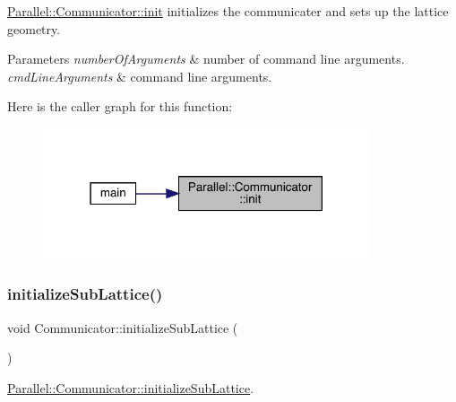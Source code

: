 \mbox{\hyperlink{class_parallel_1_1_communicator_a4ed2a77c33cd899b31131e44fc906fd7}{Parallel\+::\+Communicator\+::init}} initializes the communicater and sets up the lattice geometry. 


\begin{DoxyParams}{Parameters}
{\em number\+Of\+Arguments} & number of command line arguments. \\
\hline
{\em cmd\+Line\+Arguments} & command line arguments. \\
\hline
\end{DoxyParams}
Here is the caller graph for this function\+:
\nopagebreak
\begin{figure}[H]
\begin{center}
\leavevmode
\includegraphics[width=274pt]{class_parallel_1_1_communicator_a4ed2a77c33cd899b31131e44fc906fd7_icgraph}
\end{center}
\end{figure}
\mbox{\label{class_parallel_1_1_communicator_a3094d713d09225738ecf0250019db115}} 
\subsubsection{\texorpdfstring{initializeSubLattice()}{initializeSubLattice()}}
{\footnotesize\ttfamily void Communicator\+::initialize\+Sub\+Lattice (\begin{DoxyParamCaption}{ }\end{DoxyParamCaption})\hspace{0.3cm}{\ttfamily [static]}}



\mbox{\hyperlink{class_parallel_1_1_communicator_a3094d713d09225738ecf0250019db115}{Parallel\+::\+Communicator\+::initialize\+Sub\+Lattice}}. 

